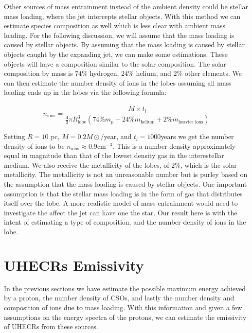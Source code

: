 

Other sources of mass entrainment instead of the ambient density could be stellar mass loading, where the jet intercepts stellar objects. With this method we can estimate species composition as well which is less clear with ambient mass loading. For the following discussion, we will assume that the mass loading is caused by stellar objects.    
 By assuming that the mass loading is caused by stellar objects caught by the expanding jet, we can make some estimations. These objects will have a composition similar to the solar composition. The solar composition by mass is $74\%$ hydrogen, $24\%$ helium, and $2\%$ other elements. We can then estimate the number density of ions in the lobes assuming all mass loading ends up in the lobes via the following formula:

\begin{equation}
    n_{\text{ions}} = \frac{\dot{M} \times t_{l} }{\frac{4}{3} \pi R_{\text{lobe}}^3 (74\%m_p+24\%m_{\text{helium}}+2\%m_{\text{heavier ions}})}
\end{equation}

Setting $R = 10$ pc, $\dot{M} = 0.2 M\odot /$year, and $t_{l} = 1000$years we get the number density of ions to be $n_{\text{ions}} \approx 0.9  \text{cm}^{-3}$. This is a number density approximately equal in magnitude than that of the lowest density gas in the interestellar medium. We also receive the metallicity of the lobes, of $2\%$, which is the solar metallicity. The metallicity is not an unreasonable number but is purley based on the assumption that the mass loading is caused by stellar objects. One important assumption is that the stellar mass loading is in the form of gas that distributes itself over the lobe. A more realistic model of mass entrainment would need to investigate the affect the jet can have one the star. Our result here is with the intent of estimating a type of composition, and the number density of ions in the lobe. 

 



\section{UHECRs Emissivity}
\label{sec:emissivity_mass_load}
In the previous sections we have estimate the possible maximum energy achieved by a proton, the number density of CSOs, and lastly the number density and composition of ions due to mass loading. With this information and given a few assumptions on the energy spectra of the protons, we can estimate the emissivity of UHECRs from these sources.

